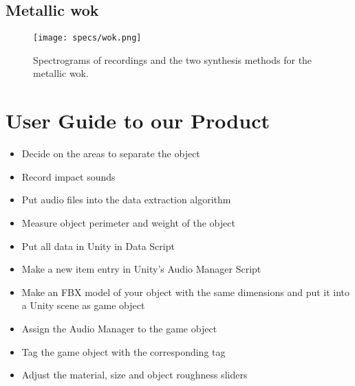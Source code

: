 \newpage

\section*{Metallic wok}

\begin{figure}[H]
  \centering
    \texttt{[image: specs/wok.png]}
      \caption{Spectrograms of recordings and the two synthesis methods for the metallic wok.}
      \label{fig:sp_wok}
\end{figure}

\newpage

\chapter{User Guide to our Product}\label{ap:guide}

\begin{itemize}
\item Decide on the areas to separate the object
\item Record impact sounds
\item Put audio files into the data extraction algorithm
\item Measure object perimeter and weight of the object
\item Put all data in Unity\textsuperscript{\textregistered} in Data Script
\item Make a new item entry in Unity\textsuperscript{\textregistered}'s Audio Manager Script
\item Make an FBX\textsuperscript{\textregistered} model of your object with the same dimensions and put it into a Unity\textsuperscript{\textregistered} scene as game object
\item Assign the Audio Manager to the game object
\item Tag the game object with the corresponding tag
\item Adjust the material, size and object roughness sliders
\end{itemize}


